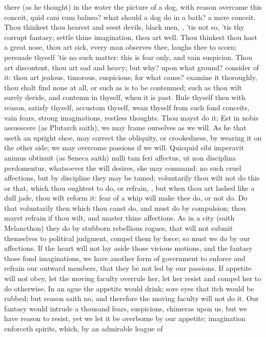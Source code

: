 {there (as he thought) in the water the picture of a dog, with reason
overcame this conceit, quid cani cum balneo? what should a dog do in a
bath? a mere conceit. Thou thinkest thou hearest and seest devils,
black men, \etc{}, 'tis not so, 'tis thy corrupt fantasy; settle thine
imagination, thou art well. Thou thinkest thou hast a great nose, thou
art sick, every man observes thee, laughs thee to scorn; persuade
thyself 'tis no such matter: this is fear only, and vain suspicion.
Thou art discontent, thou art sad and heavy; but why? upon what ground?
consider of it: thou art jealous, timorous, suspicious; for what cause?
examine it thoroughly, thou shalt find none at all, or such as is to be
contemned; such as thou wilt surely deride, and contemn in thyself,
when it is past. Rule thyself then with reason, satisfy thyself,
accustom thyself, wean thyself from such fond conceits, vain fears,
strong imaginations, restless thoughts. Thou mayst do it; Est in nobis
assuescere (as Plutarch saith), we may frame ourselves as we will. As
he that useth an upright shoe, may correct the obliquity, or
crookedness, by wearing it on the other side; we may overcome passions
if we will. Quicquid sibi imperavit animus obtinuit (as Seneca
saith) nulli tam feri affectus, ut non disciplina perdomentur,
whatsoever the will desires, she may command: no such cruel affections,
but by discipline they may be tamed; voluntarily thou wilt not do this
or that, which thou oughtest to do, or refrain, \etc{}, but when thou art
lashed like a dull jade, thou wilt reform it: fear of a whip will make
thee do, or not do. Do that voluntarily then which thou canst do, and
must do by compulsion; thou mayst refrain if thou wilt, and master
thine affections. As in a city (saith Melancthon) they do by
stubborn rebellious rogues, that will not submit themselves to
political judgment, compel them by force; so must we do by our
affections. If the heart will not lay aside those vicious motions, and
the fantasy those fond imaginations, we have another form of government
to enforce and refrain our outward members, that they be not led by our
passions. If appetite will not obey, let the moving faculty overrule
her, let her resist and compel her to do otherwise. In an ague the
appetite would drink; sore eyes that itch would be rubbed; but reason
saith no, and therefore the moving faculty will not do it. Our fantasy
would intrude a thousand fears, suspicions, chimeras upon us, but we
have reason to resist, yet we let it be overborne by our appetite;
imagination enforceth spirits, which, by an admirable league of
}
